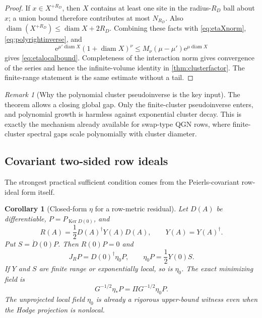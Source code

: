 \documentclass[11pt]{article}
\newtheorem{corollary}[theorem]{Corollary}
\theoremstyle{definition}
\theoremstyle{remark}
\newtheorem{remark}[theorem]{Remark}
\newcommand{\Ker}{\operatorname{Ker}}
\newcommand{\e}{\mathrm e}
\newcommand{\diam}{\operatorname{diam}}
\begin{document}
\begin{proof}
If $x\in X^{+R_D}$, then $X$ contains at least one site in the radius-$R_D$ ball about $x$; a union bound therefore contributes at most $N_{R_D}$.  Also
$\diam(X^{+R_D})\le\diam X+2R_D$.  Combining these facts with \eqref{eq:etaXnorm}, \eqref{eq:polyrightinverse}, and
\[
 \e^{\mu'\diam X}(1+\diam X)^\nu
 \le M_\nu(\mu-\mu')\e^{\mu\diam X}
\]
gives \eqref{eq:etalocalbound}.  Completeness of the interaction norm gives convergence of the series and hence the infinite-volume identity in \cref{thm:clusterfactor}.  The finite-range statement is the same estimate without a tail.
\end{proof}

\begin{remark}[Why the polynomial cluster pseudoinverse is the key input]
The theorem allows a closing global gap.  Only the finite-cluster pseudoinverse enters, and polynomial growth is harmless against exponential cluster decay.  This is exactly the mechanism already available for swap-type QGN rows, where finite-cluster spectral gaps scale polynomially with cluster diameter.
\end{remark}

\subsection{Covariant two-sided row ideals}

The strongest practical sufficient condition comes from the Peierls-covariant row-ideal form itself.

\begin{corollary}[Closed-form $\eta$ for a row-metric residual]
\label{cor:metriceta}
Let $D(A)$ be differentiable, $P=P_{\Ker D(0)}$, and
\begin{equation}
 R(A)=\frac12D(A)^\dagger Y(A)D(A),
 \qquad Y(A)=Y(A)^\dagger.
 \label{eq:rowmetricresidual}
\end{equation}
Put $S=\dot D(0)P$.  Then $R(0)P=0$ and
\begin{equation}
 \boxed{
 J_RP=D(0)^\dagger\eta_0P,
 \qquad
 \eta_0P=\frac12Y(0)S.}
 \label{eq:metriceta}
\end{equation}
If $Y$ and $S$ are finite range or exponentially local, so is $\eta_0$.  The exact minimizing field is
\begin{equation}
 G^{-1/2}\eta_*P
 =\Pi G^{-1/2}\eta_0P.
 \label{eq:metricetaprojected}
\end{equation}
The unprojected local field $\eta_0$ is already a rigorous upper-bound witness even when the Hodge projection is nonlocal.
\end{corollary}
\end{document}
